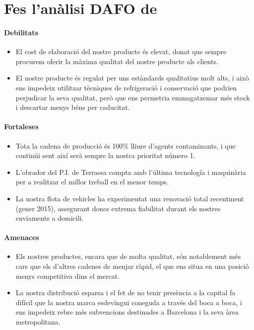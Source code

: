 \section{Fes l’anàlisi DAFO de \QnF}

\paragraph{Debilitats}
\begin{itemize}
  \item El cost de elaboració del nostre producte és elevat, donat que sempre procurem oferir la màxima qualitat del nostre producte als clients.
  \item El nostre producte és regulat per uns estàndards qualitatius molt alts, i això ens impedeix utilitzar tècniques de refrigeració i conservació que podrien perjudicar la seva qualitat, però que ens permetria emmagatzemar més stock i descartar menys béns per caducitat.
\end{itemize}

\paragraph{Fortaleses}
\begin{itemize}
  \item Tota la cadena de producció és 100\% lliure d'agents contaminants, i que continüi sent així serà sempre la nostra prioritat número 1.
  \item L'obrador del P.I. de Terrassa compta amb l'última tecnología i maquinària per a realitzar el millor treball en el menor temps.
  \item La nostra flota de vehicles ha experimentat una renovació total recentment (gener 2015), assegurant doncs extrema fiabilitat durant els nostres enviaments a domicili.
\end{itemize}

\paragraph{Amenaces}
\begin{itemize}
  \item Els nostres productes, encara que de molta qualitat, són notablement més cars que els d'altres cadenes de menjar ràpid, el que ens situa en una posició menys competitiva dins el mercat.
  \item La nostra distribució esparsa i el fet de no tenir presència a la capital fa difícil que la nostra marca esdevingui coneguda a través del boca a boca, i ens impedeix rebre més subvencions destinades a Barcelona i la seva àrea metropolitana.
\end{itemize}

